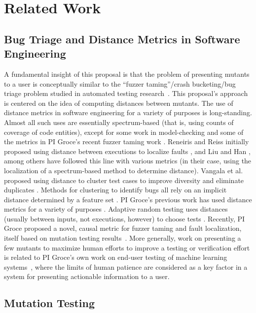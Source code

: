 \section{Related Work}

\subsection{Bug Triage and Distance Metrics in Software Engineering}

A fundamental insight of this proposal is that the problem of
presenting mutants to a user is conceptually similar to the ``fuzzer
taming''/crash bucketing/bug triage problem studied in automated
testing research~\cite{PLDI13,SemCrash}.  This proposal's approach is centered on
the idea of computing distances between mutants.  The use of distance metrics in software engineering for a variety of
purposes is long-standing.  Almost all such uses are
essentially spectrum-based \cite{RepsSpectra} (that is, using counts
of coverage of code entities), except for some work in model-checking
\cite{GroceDist,ChakiLev} and some of the metrics in PI Groce's recent fuzzer
taming work \cite{PLDI13}.  Reneiris and Reiss initially proposed
using distance between executions to localize faults
\cite{NearNeighbor}, and Liu and Han \cite{Liu06}, among others have
followed this line with various metrics (in their case, using the
localization of a spectrum-based method to determine distance).
Vangala et al. proposed using distance to cluster test cases to
improve diversity and eliminate duplicates \cite{VangalaDist}. Methods
for clustering to identify bugs all rely on an implicit distance
determined by a feature set \cite{Podgurski04}.  PI Groce's previous work
has used distance metrics for a variety of purposes
\cite{PLDI13,icst2014,issta14}.  Adaptive random testing uses
distances (usually between inputs, not executions, however) to choose
tests \cite{Chen,ARTChen,ISSTAART}.  Recently, PI Groce proposed a novel,
causal metric for fuzzer taming and fault localization, itself based on
mutation testing results~\cite{distMut}.  More generally, work on
presenting a few mutants to maximize human efforts to improve a
testing or verification effort
is related to PI Groce's own work on end-user testing of machine learning
systems~\cite{EndUserMistake,OnlyOracle}, where the limits of human
patience are considered as a key factor in a system for presenting
actionable information to a user.


\subsection{Mutation Testing}

